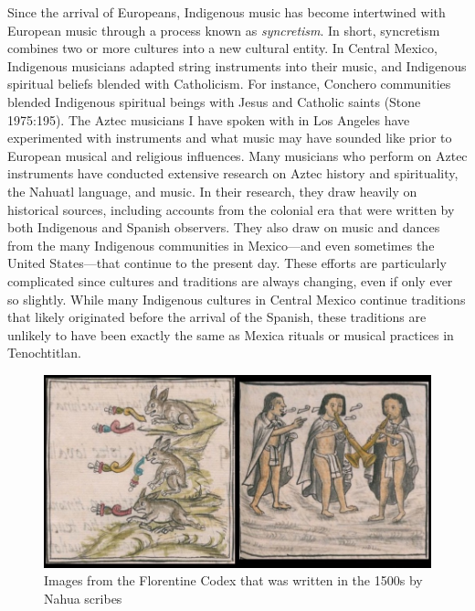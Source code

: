 \documentclass[twoside]{article}
\begin{document}
Since the arrival of Europeans, Indigenous music has become intertwined
with European music through a process known as \emph{syncretism}. In
short, syncretism combines two or more cultures into a new cultural
entity. In Central Mexico, Indigenous musicians adapted string
instruments into their music, and Indigenous spiritual beliefs blended
with Catholicism. For instance, Conchero communities blended Indigenous
spiritual beings with Jesus and Catholic saints (Stone 1975:195). The
Aztec musicians I have spoken with in Los Angeles have experimented with
instruments and what music may have sounded like prior to European
musical and religious influences. Many musicians who perform on Aztec
instruments have conducted extensive research on Aztec history and
spirituality, the Nahuatl language, and music. In their research, they
draw heavily on historical sources, including accounts from the colonial
era that were written by both Indigenous and Spanish observers. They
also draw on music and dances from the many Indigenous communities in
Mexico---and even sometimes the United States---that continue to the
present day. These efforts are particularly complicated since cultures
and traditions are always changing, even if only ever so slightly. While
many Indigenous cultures in Central Mexico continue traditions that
likely originated before the arrival of the Spanish, these traditions
are unlikely to have been exactly the same as Mexica rituals or musical
practices in Tenochtitlan.

\begin{figure}
  \includegraphics[width=\textwidth]{nielsen-fig3.jpg}
  \caption{Images from the Florentine Codex that was written in the 1500s by Nahua scribes}
\end{figure}
\end{document}
